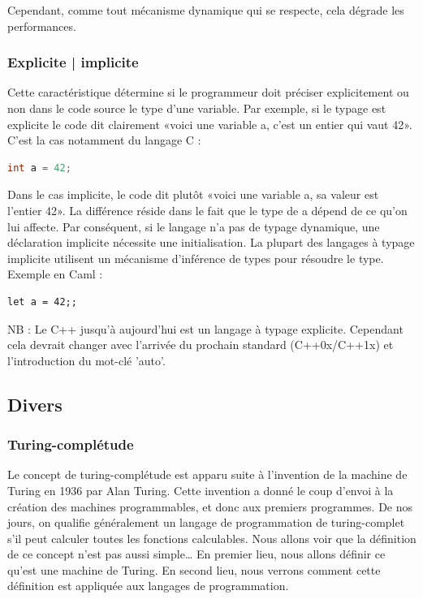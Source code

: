 Cependant, comme tout mécanisme dynamique qui se respecte, cela dégrade les performances.

\subsubsection{Explicite | implicite}
\label{explicite_implicite}

Cette caractéristique détermine si le programmeur doit préciser explicitement ou non dans le code source le type d'une variable. Par exemple, si le typage est explicite le code dit clairement «voici une variable a, c'est un entier qui vaut 42». C'est la cas notamment du langage C :

\begin{lstlisting}[language=c]
int a = 42;
\end{lstlisting}

Dans le cas implicite, le code dit plutôt «voici une variable a, sa valeur est l'entier 42». La différence réside dans le fait que le type de a dépend de ce qu'on lui affecte. Par conséquent, si le langage n'a pas de typage dynamique, une déclaration implicite nécessite une initialisation. La plupart des langages à typage implicite utilisent un mécanisme d'inférence de types pour résoudre le type. \cite{bib_wiki_inference} Exemple en Caml :

\begin{lstlisting}[language=caml]
let a = 42;;
\end{lstlisting}

NB : Le C++ jusqu'à aujourd'hui est un langage à typage explicite. Cependant cela devrait changer avec l'arrivée du prochain standard (C++0x/C++1x) et l'introduction du mot-clé 'auto'. \cite{bib_wiki_inference_cpp}

\subsection{Divers}
\label{divers}

\subsubsection{Turing-complétude}
\label{turing}

Le concept de turing-complétude est apparu suite à l'invention de la machine de Turing en 1936 par Alan Turing. Cette invention a donné le coup d'envoi à la création des machines programmables, et donc aux premiers programmes. De nos jours, on qualifie généralement un langage de programmation de turing-complet s'il peut calculer toutes les fonctions calculables. Nous allons voir que la définition de ce concept n'est pas aussi simple… En premier lieu, nous allons définir ce qu'est une machine de Turing. En second lieu, nous verrons comment cette définition est appliquée aux langages de programmation.

